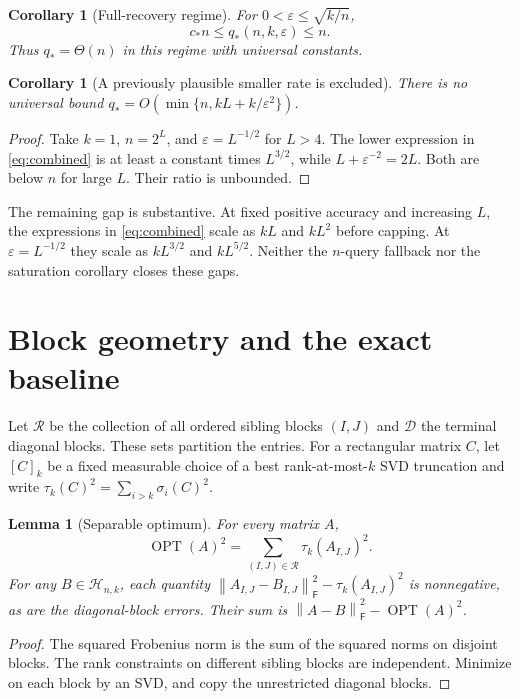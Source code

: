 \documentclass[11pt]{article}
\newtheorem{lemma}[theorem]{Lemma}
\newtheorem{corollary}[theorem]{Corollary}
\theoremstyle{remark}
\newcommand{\F}{\mathsf F}
\newcommand{\Hclass}{\mathcal H_{n,k}}
\newcommand{\OPT}{\operatorname{OPT}}
\newcommand{\eps}{\varepsilon}
\newcommand{\norm}[1]{\left\lVert #1\right\rVert}
\begin{document}
\begin{corollary}[Full-recovery regime]\label{cor:full}
For $0<\eps\le\sqrt{k/n}$,
\[
 c_* n\le q_*(n,k,\eps)\le n.
\]
Thus $q_*=\Theta(n)$ in this regime with universal constants.
\end{corollary}

\begin{corollary}[A previously plausible smaller rate is excluded]
There is no universal bound
$q_*=O(\min\{n,kL+k/\eps^2\})$.
\end{corollary}
\begin{proof}
Take $k=1$, $n=2^L$, and $\eps=L^{-1/2}$ for $L>4$.
The lower expression in \eqref{eq:combined} is at least a constant times
$L^{3/2}$, while $L+\eps^{-2}=2L$. Both are below $n$ for large $L$.
Their ratio is unbounded.
\end{proof}

The remaining gap is substantive. At fixed positive accuracy and increasing
$L$, the expressions in \eqref{eq:combined} scale as $kL$ and $kL^2$ before
capping. At $\eps=L^{-1/2}$ they scale as $kL^{3/2}$ and $kL^{5/2}$.
Neither the $n$-query fallback nor the saturation corollary closes these gaps.

\section{Block geometry and the exact baseline}\label{sec:geometry}

Let $\mathcal R$ be the collection of all ordered sibling blocks $(I,J)$ and
$\mathcal D$ the terminal diagonal blocks. These sets partition the entries.
For a rectangular matrix $C$, let $[C]_k$ be a fixed measurable choice of a
best rank-at-most-$k$ SVD truncation and write
$\tau_k(C)^2=\sum_{i>k}\sigma_i(C)^2$.

\begin{lemma}[Separable optimum]\label{lem:separable}
For every matrix $A$,
\begin{equation}\label{eq:separable}
 \OPT(A)^2=\sum_{(I,J)\in\mathcal R}\tau_k(A_{I,J})^2.
\end{equation}
For any $B\in\Hclass$, each quantity
$\norm{A_{I,J}-B_{I,J}}_\F^2-\tau_k(A_{I,J})^2$ is nonnegative,
as are the diagonal-block errors. Their sum is
$\norm{A-B}_\F^2-\OPT(A)^2$.
\end{lemma}
\begin{proof}
The squared Frobenius norm is the sum of the squared norms on disjoint blocks.
The rank constraints on different sibling blocks are independent. Minimize
on each block by an SVD, and copy the unrestricted diagonal blocks.
\end{proof}
\end{document}
